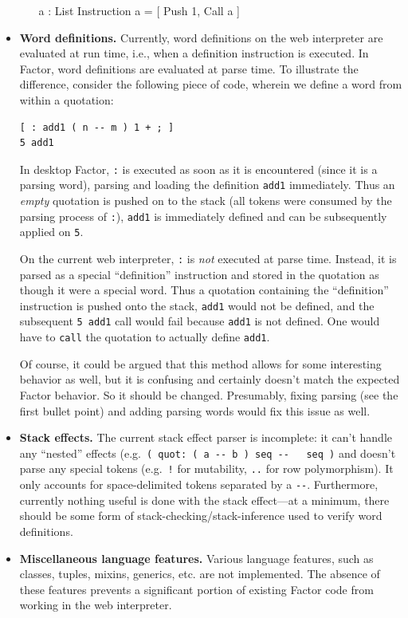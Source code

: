 \documentclass[
]{article}
\newenvironment{Shaded}{}{}
\newcommand{\DataTypeTok}[1]{\textcolor[rgb]{0.56,0.13,0.00}{#1}}
\newcommand{\DecValTok}[1]{\textcolor[rgb]{0.25,0.63,0.44}{#1}}
\newcommand{\FunctionTok}[1]{\textcolor[rgb]{0.02,0.16,0.49}{#1}}
\newcommand{\NormalTok}[1]{#1}
\newcommand{\OperatorTok}[1]{\textcolor[rgb]{0.40,0.40,0.40}{#1}}
\begin{document}
\begin{itemize}
\begin{itemize}
\begin{Shaded}
\begin{Highlighting}[]
\FunctionTok{a}\NormalTok{ : }\DataTypeTok{List} \DataTypeTok{Instruction}
\FunctionTok{a} \OperatorTok{=}\NormalTok{ [ }\DataTypeTok{Push} \DecValTok{1}\OperatorTok{,} \DataTypeTok{Call} \FunctionTok{a}\NormalTok{ ]}
\end{Highlighting}
\end{Shaded}
  \end{itemize}
\item
  \textbf{Word definitions.} Currently, word definitions on the web
  interpreter are evaluated at run time, i.e., when a definition
  instruction is executed. In Factor, word definitions are evaluated at
  parse time. To illustrate the difference, consider the following piece
  of code, wherein we define a word from within a quotation:

\begin{verbatim}
[ : add1 ( n -- m ) 1 + ; ]
5 add1
\end{verbatim}

  In desktop Factor, \texttt{:} is executed as soon as it is encountered
  (since it is a parsing word), parsing and loading the definition
  \texttt{add1} immediately. Thus an \emph{empty} quotation is pushed on
  to the stack (all tokens were consumed by the parsing process of
  \texttt{:}), \texttt{add1} is immediately defined and can be
  subsequently applied on \texttt{5}.

  On the current web interpreter, \texttt{:} is \emph{not} executed at
  parse time. Instead, it is parsed as a special ``definition''
  instruction and stored in the quotation as though it were a special
  word. Thus a quotation containing the ``definition'' instruction is
  pushed onto the stack, \texttt{add1} would not be defined, and the
  subsequent \texttt{5\ add1} call would fail because \texttt{add1} is
  not defined. One would have to \texttt{call} the quotation to actually
  define \texttt{add1}.

  Of course, it could be argued that this method allows for some
  interesting behavior as well, but it is confusing and certainly
  doesn't match the expected Factor behavior. So it should be changed.
  Presumably, fixing parsing (see the first bullet point) and adding
  parsing words would fix this issue as well.
\item
  \textbf{Stack effects.} The current stack effect parser is incomplete:
  it can't handle any ``nested'' effects
  (e.g.~\texttt{(\ quot:\ (\ a\ -\/-\ b\ )\ seq\ -\/-\ \ \ seq\textquotesingle{}\ )}
  and doesn't parse any special tokens (e.g.~\texttt{!} for mutability,
  \texttt{..} for row polymorphism). It only accounts for
  space-delimited tokens separated by a \texttt{-\/-}. Furthermore,
  currently nothing useful is done with the stack effect---at a minimum,
  there should be some form of stack-checking/stack-inference used to
  verify word definitions.
\item
  \textbf{Miscellaneous language features.} Various language features,
  such as classes, tuples, mixins, generics, etc. are not implemented.
  The absence of these features prevents a significant portion of
  existing Factor code from working in the web interpreter.
\end{itemize}
\end{document}
